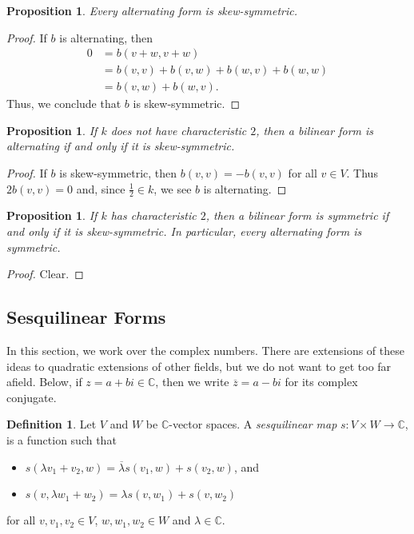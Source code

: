\documentclass[12pt]{article}
\theoremstyle{plain}
\newtheorem{proposition}[theorem]{Proposition}
\theoremstyle{definition}
\newtheorem{definition}[theorem]{Definition}
\theoremstyle{remark}
\numberwithin{equation}{section}
\begin{document}
\begin{proposition}
Every alternating form is skew-symmetric.
\end{proposition}

\begin{proof}
If $b$ is alternating, then
\begin{align*}
0 &= b(v+w,v+w)\\
&= b(v,v) + b(v,w) + b(w,v) + b(w,w)\\
&= b(v,w)+b(w,v)
.\end{align*}
Thus, we conclude that $b$ is skew-symmetric.
\end{proof}

\begin{proposition}
If $k$ does \emph{not} have characteristic $2$, then a bilinear form is
alternating if and only if it is skew-symmetric.
\end{proposition}

\begin{proof}
If $b$ is skew-symmetric, then $b(v,v)=-b(v,v)$ for all $v \in V$.
Thus $2b(v,v)=0$ and, since $\frac{1}{2} \in k$,
we see $b$ is alternating.
\end{proof}

\begin{proposition}
If $k$ has characteristic $2$, then a bilinear form is
symmetric if and only if it is skew-symmetric.
In particular, every alternating form is symmetric.
\end{proposition}

\begin{proof}
Clear.
\end{proof}

\subsection{Sesquilinear Forms}

In this section, we work over the complex numbers.
There are extensions of these ideas to quadratic extensions of other
fields, but we do not want to get too far afield.
Below, if $z=a+bi \in \mathbb{C}$, then we write
$\overline{z}=a-bi$ for its complex conjugate.

\begin{definition}
Let $V$ and $W$ be $\mathbb{C}$-vector spaces.
A \emph{sesquilinear map} $s: V \times W \to \mathbb{C}$,
is a function such that
\begin{itemize}
\item $s(\lambda v_1+v_2,w) = \overline{\lambda} s(v_1,w) + s(v_2,w)$, and
\item $s(v,\lambda w_1+w_2) = \lambda s(v,w_1) + s(v,w_2)$
\end{itemize}
for all $v,v_1,v_2 \in V$, $w,w_1,w_2 \in W$ and $\lambda \in \mathbb{C}$.
\end{definition}
\end{document}
